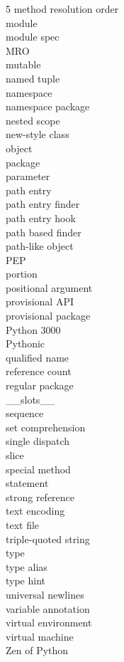 \documentclass [8pt] {extarticle}
\begin{document}
\begin {multicols} {5}
        method resolution order \\
        module \\
        module spec \\
        MRO \\
        mutable \\
        named tuple \\
        namespace \\
        namespace package \\
        nested scope \\
        new-style class \\
        object \\
        package \\
        parameter \\
        path entry \\
        path entry finder \\
        path entry hook \\
        path based finder \\
        path-like object \\
        PEP \\
        portion \\
        positional argument \\
        provisional API \\
        provisional package \\
        Python 3000 \\
        Pythonic \\
        qualified name \\
        reference count \\
        regular package \\
        \_\_slots\_\_ \\
        sequence \\
        set comprehension \\
        single dispatch \\
        slice \\
        special method \\
        statement \\
        strong reference \\
        text encoding \\
        text file \\
        triple-quoted string \\
        type \\
        type alias \\
        type hint \\
        universal newlines \\
        variable annotation \\
        virtual environment \\
        virtual machine \\
        Zen of Python \\
    \end {multicols}
\end{document}
